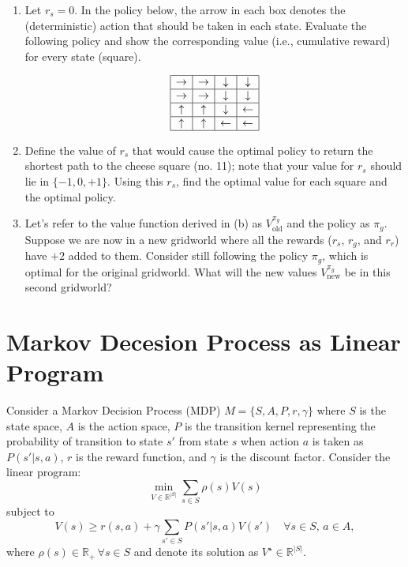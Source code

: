 \documentclass[a3paper,12pt]{extarticle} %
\begin{document}
\begin{enumerate}
   \item  Let $r_s = 0$. In the policy below, the arrow in each box denotes the (deterministic) action
    that should be taken in each state. Evaluate the following policy and show the corresponding value
    (i.e., cumulative reward) for every state (square).

    \[
    \begin{array}{|c|c|c|c|}
    \hline
    \rightarrow & \rightarrow & \downarrow & \downarrow \\
    \hline
    \rightarrow & \rightarrow & \downarrow & \downarrow \\
    \hline
    \uparrow & \uparrow & \downarrow & \leftarrow \\
    \hline
    \uparrow & \uparrow & \leftarrow & \leftarrow \\
    \hline
    \end{array}
    \]
    
    \item Define the value of $r_s$ that would cause the optimal policy to return the shortest path to the
    cheese square (no. 11); note that your value for $r_s$ should lie in $\{-1, 0, +1\}$. Using this $r_s$, find the
    optimal value for each square and the optimal policy.

    \item Let’s refer to the value function derived in (b) as $V^{\pi_g}_{\text{old}}$ and the policy as $\pi_g$. Suppose we are
    now in a new gridworld where all the rewards ($r_s$, $r_g$, and $r_r$) have $+2$ added to them. Consider still
    following the policy $\pi_g$, which is optimal for the original gridworld. What will the new values $V^{\pi_g}_{\text{new}}$ be
    in this second gridworld?
\end{enumerate}

\newpage
\section{Markov Decesion Process as Linear Program}
Consider a Markov Decision Process (MDP) $M = \{S, A, P, r, \gamma\}$ where $S$ is the state space, $A$ is the action space, $P$ is the transition kernel representing the probability of transition to state $s'$ from state $s$ when action $a$ is taken as $P(s'|s, a)$, $r$ is the reward function, and $\gamma$ is the discount factor. Consider the linear program:
\[
\min_{V \in \mathbb{R}^{|S|}} \sum_{s \in S} \rho(s)V(s)
\]
subject to
\[
V(s) \geq r(s, a) + \gamma \sum_{s' \in S} P(s'|s, a)V(s') \quad \forall s \in S, \, a \in A,
\]
where $\rho(s) \in \mathbb{R}_+ \, \forall s \in S$ and denote its solution as $V^\star \in \mathbb{R}^{|S|}$.
\end{document}
